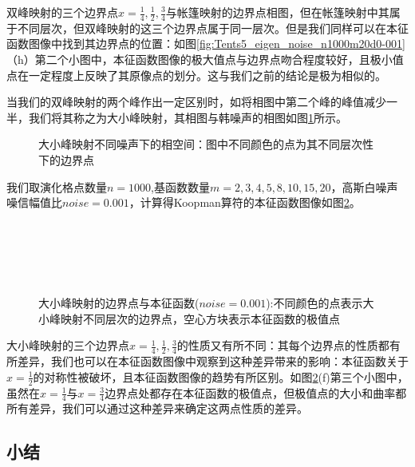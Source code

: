 双峰映射的三个边界点$x=\frac{1}{4},\frac{1}{2},\frac{3}{4}$与帐篷映射的边界点相图，但在帐篷映射中其属于不同层次，但双峰映射的这三个边界点属于同一层次。但是我们同样可以在本征函数图像中找到其边界点的位置：如图\ref{fig:Tents5_eigen_noise_n1000m20d0-001}（h）第二个小图中，本征函数图像的极大值点与边界点吻合程度较好，且极小值点在一定程度上反映了其原像点的划分。这与我们之前的结论是极为相似的。

当我们的双峰映射的两个峰作出一定区别时，如将相图中第二个峰的峰值减少一半，我们将其称之为大小峰映射，其相图与韩噪声的相图如图\ref{fig:Tents5l_noise_phase_d0}所示。

\begin{figure}[!]
  \centering
  \caption[大小峰映射不同噪声下的相空间]{大小峰映射不同噪声下的相空间：图中不同颜色的点为其不同层次性下的边界点}\label{fig:Tents5l_noise_phase_d0}
\end{figure}

我们取演化格点数量$n=1000$,基函数数量$m=2,3,4,5,8,10,15,20$，高斯白噪声噪信幅值比$noise=0.001$，计算得Koopman算符的本征函数图像如图\ref{fig:Tents5l_eigen_noise_n1000m20d0-001}。

\begin{figure}[!]
  \centering%
    \\
    \\
    \\
    \\
    \caption[大小峰映射的边界点与本征函数]{大小峰映射的边界点与本征函数($noise=0.001$):不同颜色的点表示大小峰映射不同层次的边界点，空心方块表示本征函数的极值点}\label{fig:Tents5l_eigen_noise_n1000m20d0-001}
\end{figure}

大小峰映射的三个边界点$x=\frac{1}{4},\frac{1}{2},\frac{3}{4}$的性质又有所不同：其每个边界点的性质都有所差异，我们也可以在本征函数图像中观察到这种差异带来的影响：本征函数关于$x=\frac{1}{2}$的对称性被破坏，且本征函数图像的趋势有所区别。如图\ref{fig:Tents5l_eigen_noise_n1000m20d0-001}(f)第三个小图中，虽然在$x=\frac{1}{4}$与$x=\frac{3}{4}$边界点处都存在本征函数的极值点，但极值点的大小和曲率都所有差异，我们可以通过这种差异来确定这两点性质的差异。

\subsection{小结}